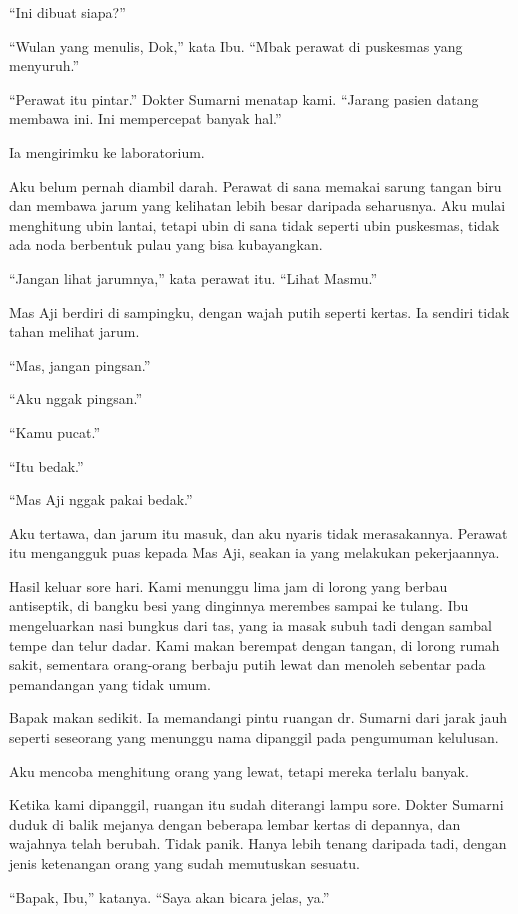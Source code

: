 \documentclass[11pt,twoside,openany]{book}
\makeatletter
\newcommand{\scenebreak}{\par\vspace{0.9em}{\centering\textsc{*\hspace{0.7em}*\hspace{0.7em}*}\par}\vspace{0.9em}\@afterindentfalse\@afterheading}
\makeatother
\begin{document}
``Ini dibuat siapa?''

``Wulan yang menulis, Dok,'' kata Ibu. ``Mbak perawat di puskesmas yang menyuruh.''

``Perawat itu pintar.'' Dokter Sumarni menatap kami. ``Jarang pasien datang membawa ini. Ini mempercepat banyak hal.''

Ia mengirimku ke laboratorium.

Aku belum pernah diambil darah. Perawat di sana memakai sarung tangan biru dan membawa jarum yang kelihatan lebih besar daripada seharusnya. Aku mulai menghitung ubin lantai, tetapi ubin di sana tidak seperti ubin puskesmas, tidak ada noda berbentuk pulau yang bisa kubayangkan.

``Jangan lihat jarumnya,'' kata perawat itu. ``Lihat Masmu.''

Mas Aji berdiri di sampingku, dengan wajah putih seperti kertas. Ia sendiri tidak tahan melihat jarum.

``Mas, jangan pingsan.''

``Aku nggak pingsan.''

``Kamu pucat.''

``Itu bedak.''

``Mas Aji nggak pakai bedak.''

Aku tertawa, dan jarum itu masuk, dan aku nyaris tidak merasakannya. Perawat itu mengangguk puas kepada Mas Aji, seakan ia yang melakukan pekerjaannya.

\scenebreak
Hasil keluar sore hari. Kami menunggu lima jam di lorong yang berbau antiseptik, di bangku besi yang dinginnya merembes sampai ke tulang. Ibu mengeluarkan nasi bungkus dari tas, yang ia masak subuh tadi dengan sambal tempe dan telur dadar. Kami makan berempat dengan tangan, di lorong rumah sakit, sementara orang-orang berbaju putih lewat dan menoleh sebentar pada pemandangan yang tidak umum.

Bapak makan sedikit. Ia memandangi pintu ruangan dr. Sumarni dari jarak jauh seperti seseorang yang menunggu nama dipanggil pada pengumuman kelulusan.

Aku mencoba menghitung orang yang lewat, tetapi mereka terlalu banyak.

Ketika kami dipanggil, ruangan itu sudah diterangi lampu sore. Dokter Sumarni duduk di balik mejanya dengan beberapa lembar kertas di depannya, dan wajahnya telah berubah. Tidak panik. Hanya lebih tenang daripada tadi, dengan jenis ketenangan orang yang sudah memutuskan sesuatu.

``Bapak, Ibu,'' katanya. ``Saya akan bicara jelas, ya.''
\end{document}
